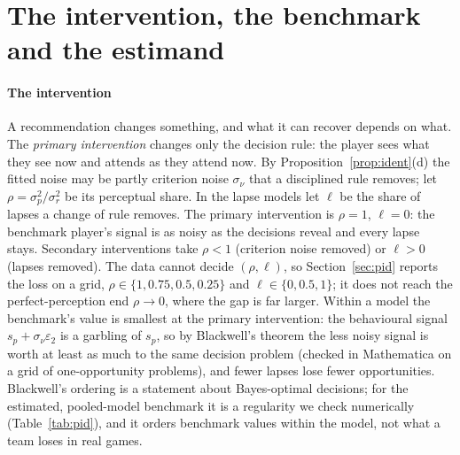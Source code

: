 \documentclass[aoas]{imsart}
\theoremstyle{plain}
\theoremstyle{definition}
\begin{document}
\begin{table}[t]
\caption{Decision models at least as good as the homogeneous comparator by BIC (all variants in
Table~). $k$: parameters; $\Delta$BIC: relative to the comparator (negative is better);
$\sigma_r$ at the bottom edge. Gap: the accounting index under the primary intervention ($\rho=1$, $\ell=0$), wins per
team-season, full policy cross-fit (Section~\ref{sec:honest}), $R=16$ worlds per split (Monte Carlo SE about 0.013), averaged over
$S=\GapS$ splits for the primary model, the comparator and the comparator with state terms and $S=4$ for the others;
the split SD is \SplitSDLo--\SplitSDHi, so the column resolves differences of about 0.02. In
\LapseSplitsNotOK{} of the \LapseSplits{} splits of the comparator with a lapse rate (\TimeLapseSplitsNotOK{} of
\TimeLapseSplits{} with the time terms) a fold's fit stopped at its iteration limit.}\label{tab:variants}
\centering\small

\end{table}

\section{The intervention, the benchmark and the estimand}\label{sec:interv}

\paragraph{The intervention} A recommendation changes something, and what it can recover depends on what. The
\emph{primary intervention} changes only the decision rule: the player sees what they see now and attends as they
attend now. By Proposition~\ref{prop:ident}(d) the fitted noise may be partly criterion noise $\sigma_\nu$ that a
disciplined rule removes; let $\rho=\sigma_p^2/\sigma_r^2$ be its perceptual share. In the lapse models let $\ell$ be
the share of lapses a change of rule removes. The primary intervention is $\rho=1$, $\ell=0$: the benchmark player's
signal is as noisy as the decisions reveal and every lapse stays. Secondary interventions take $\rho<1$ (criterion
noise removed) or $\ell>0$ (lapses removed). The data cannot decide $(\rho,\ell)$, so Section~\ref{sec:pid} reports the
loss on a grid, $\rho\in\{1,0.75,0.5,0.25\}$ and $\ell\in\{0,0.5,1\}$; it does not reach the perfect-perception end
$\rho\to0$, where the gap is far larger. Within a model the benchmark's value is smallest at the primary intervention:
the behavioural signal $s_p+\sigma_\nu\varepsilon_2$ is a garbling of $s_p$, so by Blackwell's theorem
\citep{Blackwell1953} the less noisy signal is worth at least as much to the same decision problem (checked in
Mathematica on a grid of one-opportunity problems), and fewer lapses lose fewer opportunities. Blackwell's ordering is a statement about Bayes-optimal decisions; for the estimated,
pooled-model benchmark it is a regularity we check numerically (Table~\ref{tab:pid}), and it orders benchmark values
within the model, not what a team loses in real games.
\end{document}
